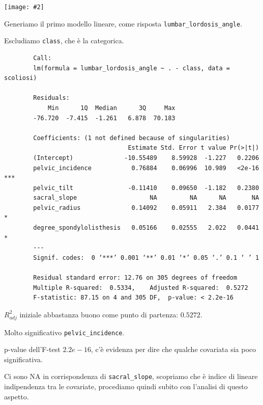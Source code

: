 \documentclass{beamer}
\newcommand{\fg}[2]{%
  \begin{center}
      \texttt{[image: \#2]}%
  \end{center}
}
\begin{document}
\begin{frame}
	\fg{0.5}{00ggpairs_scoliosi}
\end{frame}



\begin{frame}[fragile]
	Generiamo il primo modello lineare, come risposta \texttt{lumbar\_lordosis\_angle}.
	
	Escludiamo \texttt{class}, che è la categorica.

	{\tiny
	\begin{verbatim}
		Call:
		lm(formula = lumbar_lordosis_angle ~ . - class, data = scoliosi)

		Residuals:
		    Min      1Q  Median      3Q     Max 
		-76.720  -7.415  -1.261   6.878  70.183 

		Coefficients: (1 not defined because of singularities)
		                          Estimate Std. Error t value Pr(>|t|)    
		(Intercept)              -10.55489    8.59928  -1.227   0.2206    
		pelvic_incidence           0.76884    0.06996  10.989   <2e-16 ***
		pelvic_tilt               -0.11410    0.09650  -1.182   0.2380    
		sacral_slope                    NA         NA      NA       NA    
		pelvic_radius              0.14092    0.05911   2.384   0.0177 *  
		degree_spondylolisthesis   0.05166    0.02555   2.022   0.0441 *  
		---
		Signif. codes:  0 ‘***’ 0.001 ‘**’ 0.01 ‘*’ 0.05 ‘.’ 0.1 ‘ ’ 1

		Residual standard error: 12.76 on 305 degrees of freedom
		Multiple R-squared:  0.5334,	Adjusted R-squared:  0.5272 
		F-statistic: 87.15 on 4 and 305 DF,  p-value: < 2.2e-16

	\end{verbatim}
	}
\end{frame}


\begin{frame}
	$R^2_{adj}$ iniziale abbastanza buono come punto di partenza: $0.5272$.

	Molto significativo \texttt{pelvic\_incidence}.

	p-value dell'F-test $2.2e-16$, c'è evidenza per dire che qualche covariata sia poco significativa.

	Ci sono NA in corrispondenza di \texttt{sacral\_slope}, scopriamo che è indice di lineare indipendenza tra le covariate, procediamo quindi subito con l'analisi di questo aspetto.
\end{frame}
\end{document}
